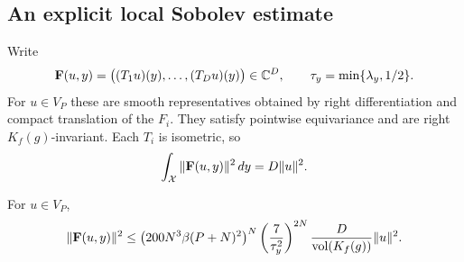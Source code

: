 \subsection{An explicit local Sobolev estimate}

Write
\[
 {\bf F}(u,y)=\bigl((T_1u)(y),\ldots,(T_Du)(y)\bigr)
                         \in\mathbb C^D,\qquad
                  \tau_y=\min\{\lambda_y,1/2\}.
\]
For \(u\in V_P\) these are smooth representatives
obtained by right differentiation and compact
translation of the \(F_i\).  They satisfy pointwise
equivariance and are right \(K_f(g)\)-invariant.
Each \(T_i\) is isometric, so
\begin{equation}\label{dc-L2}
       \int_{\mathcal X}\|{\bf F}(u,y)\|^2\,dy=D\|u\|^2.
\end{equation}

\begin{lemma}\label{dc-sobolev}
For \(u\in V_P\),
\begin{equation}\label{dc-sobolev-bound}
 \|{\bf F}(u,y)\|^2
 \le
  \bigl(200N^3\beta(P+N)^2\bigr)^N
       \left(\frac7{\tau_y^2}\right)^{2N}
          \frac{D}{\operatorname{vol}(K_f(g))}\|u\|^2.
\end{equation}
\end{lemma}
